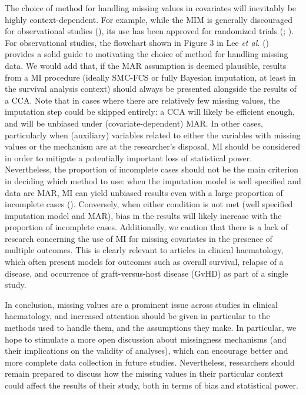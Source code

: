 \documentclass[
  letterpaper,
  DIV=11,
  numbers=noendperiod]{scrreprt}
\begin{document}
The choice of method for handling missing values in covariates will
inevitably be highly context-dependent. For example, while the MIM is
generally discouraged for observational studies
(), its use has been approved for randomized trials
(; ). For observational studies, the flowchart shown in
Figure 3 in Lee \emph{et al.}
() provides a
solid guide to motivating the choice of method for handling missing
data. We would add that, if the MAR assumption is deemed plausible,
results from a MI procedure (ideally SMC-FCS or fully Bayesian
imputation, at least in the survival analysis context) should always be
presented alongside the results of a CCA. Note that in cases where there
are relatively few missing values, the imputation step could be skipped
entirely: a CCA will likely be efficient enough, and will be unbiased
under (covariate-dependent) MAR. In other cases, particularly when
(auxiliary) variables related to either the variables with missing
values or the mechanism are at the researcher's disposal, MI should be
considered in order to mitigate a potentially important loss of
statistical power. Nevertheless, the proportion of incomplete cases
should not be the main criterion in deciding which method to use: when
the imputation model is well specified and data are MAR, MI can yield
unbiased results even with a large proportion of incomplete cases
(). Conversely, when either condition is not met
(well specified imputation model and MAR), bias in the results will
likely increase with the proportion of incomplete cases. Additionally,
we caution that there is a lack of research concerning the use of MI for
missing covariates in the presence of multiple outcomes. This is clearly
relevant to articles in clinical haematology, which often present models
for outcomes such as overall survival, relapse of a disease, and
occurrence of graft-versus-host disease (GvHD) as part of a single
study.

In conclusion, missing values are a prominent issue across studies in
clinical haematology, and increased attention should be given in
particular to the methods used to handle them, and the assumptions they
make. In particular, we hope to stimulate a more open discussion about
missingness mechanisms (and their implications on the validity of
analyses), which can encourage better and more complete data collection
in future studies. Nevertheless, researchers should remain prepared to
discuss how the missing values in their particular context could affect
the results of their study, both in terms of bias and statistical power.
\end{document}
